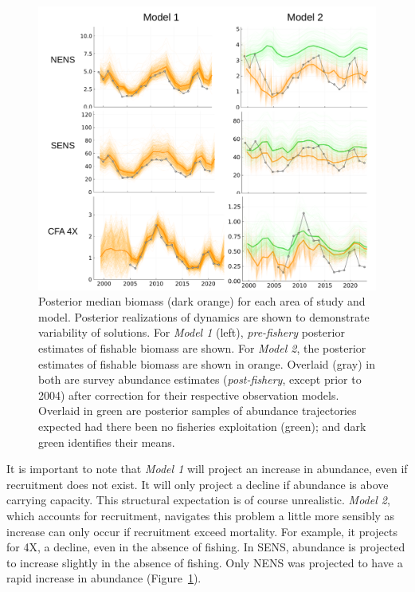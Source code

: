 \documentclass[
	letterpaper, %
	10pt, %
]{article}
\begin{document}
 
\begin{figure}
	\includegraphics[width=\linewidth]{media/predictions.png}
	\caption{Posterior median biomass (dark orange) for each area of
	study and model. Posterior realizations of dynamics are shown
	to demonstrate variability of solutions. For \emph{Model 1} (left), \emph{pre-fishery}
	posterior estimates of fishable biomass are shown. For \emph{Model 2}, the posterior estimates
	of fishable biomass are shown in orange. Overlaid (gray) in both are
	survey abundance estimates (\emph{post-fishery}, except prior to 2004) after
	correction for their respective observation models. Overlaid in green
	are posterior samples of abundance trajectories expected had there
	been no fisheries exploitation (green); and dark green identifies their means.}
	\label{fig5_predictions}
	\end{figure}    
 


It is important to note that \emph{Model 1} will project an increase in abundance,
even if recruitment does not exist. It will only project a decline
if abundance is above carrying capacity. This structural expectation
is of course unrealistic. \emph{Model 2}, which accounts for recruitment,
navigates this problem a little more sensibly as increase can only occur if recruitment exceed mortality. For example, it projects for 4X,
a decline, even in the absence of fishing. In SENS, abundance is projected
to increase slightly in the absence of fishing. Only NENS was projected
to have a rapid increase in abundance (Figure~\ref{fig5_predictions}).
\end{document}
